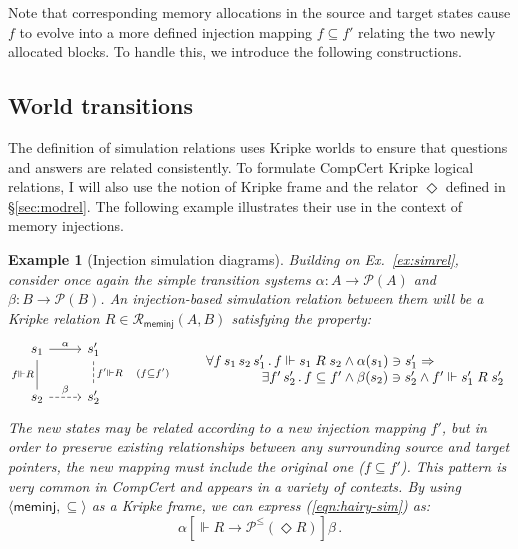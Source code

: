 \documentclass[11pt,oneside,draft]{book}
\newtheorem{example}[theorem]{Example}
\theoremstyle{definition}
\newcommand{\kw}[1]{\ensuremath{ \mathsf{#1} }}
\newcommand{\ifr}[1]{\mathrel{[{#1}]}}
\begin{document}
Note that corresponding memory allocations
in the source and target states cause $f$ to
evolve into a more defined injection mapping $f \subseteq f'$
relating the two newly allocated blocks.
To handle this,
we introduce the following constructions.


\subsection{World transitions} %

The definition of simulation relations
uses Kripke worlds to ensure that questions and answers
are related consistently.
To formulate CompCert Kripke logical relations,
I will also use the notion of Kripke frame
and the relator $\Diamond$ defined in \S\ref{sec:modrel}.
The following example illustrates their use
in the context of memory injections.

\begin{example}[Injection simulation diagrams] \label{ex:sim} %
Building on Ex.~\ref{ex:simrel},
consider once again the simple transition systems
$\alpha : A \rightarrow \mathcal{P}(A)$ and
$\beta : B \rightarrow \mathcal{P}(B)$.
An injection-based simulation relation between them
will be a Kripke relation
$R \in \mathcal{R}_\kw{meminj}(A, B)$
satisfying the property:
\begin{equation}
    \label{eqn:hairy-sim}
  \begin{tikzcd}[scale=0.8]
    s_1 \arrow[r, "\alpha"]
        \arrow[d, dash, "f \Vdash R"'] &
    s_1' \arrow[d, dashed, dash, "f' \Vdash R \quad (f \subseteq f')"] \\
    s_2 \arrow[r, dashed, "\beta"] &
    s_2'
  \end{tikzcd}
  \qquad
    \begin{array}{r@{}l}
    \forall f \, s_1 \, s_2 \, s_1' \,.\,
      f \Vdash s_1 \mathrel{R} s_2 &{} \wedge
      \alpha(s_1) \ni s_1' \Rightarrow \\
    \exists f' \, s_2' \,.\,
      f \subseteq f' &{} \wedge
      \beta(s_2) \ni s_2' \wedge
      f' \Vdash s_1' \mathrel{R} s_2'
    \end{array}
\end{equation}
The new states may be related according to
a new injection mapping $f'$,
but in order to preserve existing relationships
between any surrounding source and target pointers,
the new mapping must include
the original one ($f \subseteq f'$).
This pattern is very common in CompCert
and appears in a variety of contexts.
By using $\langle \kw{meminj}, {\subseteq} \rangle$
as a Kripke frame,
we can express
(\ref{eqn:hairy-sim}) as:
\[
  \alpha \ifr{\Vdash R \rightarrow \mathcal{P}^\le(\Diamond R)} \beta \,.
\]
\end{example}
\end{document}
